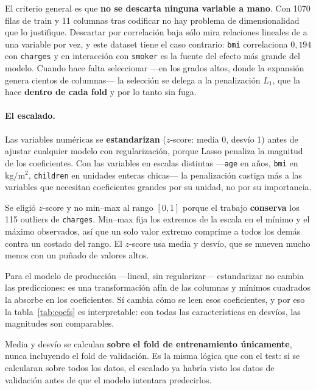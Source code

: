 \documentclass[11pt,a4paper]{article}
\begin{document}
El criterio general es que \textbf{no se descarta ninguna variable a mano}. Con 1070 filas de
train y 11 columnas tras codificar no hay problema de dimensionalidad que lo justifique.
Descartar por correlación baja sólo mira relaciones lineales de a una variable por vez, y este
dataset tiene el caso contrario: \texttt{bmi} correlaciona $0{,}194$ con \texttt{charges} y en
interacción con \texttt{smoker} es la fuente del efecto más grande del modelo. Cuando hace
falta seleccionar ---en los grados altos, donde la expansión genera cientos de columnas--- la
selección se delega a la penalización $L_1$, que la hace \textbf{dentro de cada fold} y por lo
tanto sin fuga.

\paragraph{El escalado.}
Las variables numéricas se \textbf{estandarizan} ($z$-score: media 0, desvío 1) antes de
ajustar cualquier modelo con regularización, porque Lasso penaliza la magnitud de los
coeficientes. Con las variables en escalas distintas ---\texttt{age} en años, \texttt{bmi} en
kg/m$^2$, \texttt{children} en unidades enteras chicas--- la penalización castiga más a las
variables que necesitan coeficientes grandes por su unidad, no por su importancia.

Se eligió $z$-score y no min--max al rango $[0,1]$ porque el trabajo \textbf{conserva} los 115
outliers de \texttt{charges}. Min--max fija los extremos de la escala en el mínimo y el máximo
observados, así que un solo valor extremo comprime a todos los demás contra un costado del
rango. El $z$-score usa media y desvío, que se mueven mucho menos con un puñado de valores
altos.

Para el modelo de producción ---lineal, sin regularizar--- estandarizar no cambia las
predicciones: es una transformación afín de las columnas y mínimos cuadrados la absorbe en los
coeficientes. Sí cambia cómo se leen esos coeficientes, y por eso la tabla~\ref{tab:coefs} es
interpretable: con todas las características en desvíos, las magnitudes son comparables.

Media y desvío se calculan \textbf{sobre el fold de entrenamiento únicamente}, nunca
incluyendo el fold de validación. Es la misma lógica que con el test: si se calcularan sobre
todos los datos, el escalado ya habría visto los datos de validación antes de que el modelo
intentara predecirlos.

\end{document}
